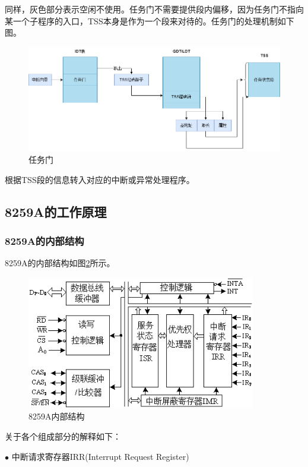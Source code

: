 \documentclass[UTF8,12pt]{ctexart}
\begin{document}
    同样，灰色部分表示空闲不使用。任务门不需要提供段内偏移，因为任务门不指向某一个子程序的入口，TSS本身是作为一个段来对待的。任务门的处理机制如下图。
    
    \begin{figure}[H]
        \centering
        \includegraphics[width=15cm]{images/任务门.png}
        \caption{任务门}
        \label{任务门}
    \end{figure}
    
    根据TSS段的信息转入对应的中断或异常处理程序。
    
    \subsection{8259A的工作原理}
    \subsubsection{8259A的内部结构}
    8259A的内部结构如图\ref{8259A内部结构}所示。
    \begin{figure}[H]
        \centering
        \includegraphics[width=10cm]{images/8259A内部结构.png}
        \caption{8259A内部结构}
        \label{8259A内部结构}
    \end{figure}
    
    关于各个组成部分的解释如下：
    
    $\bullet$ 中断请求寄存器IRR(Interrupt Request Register)
\end{document}

